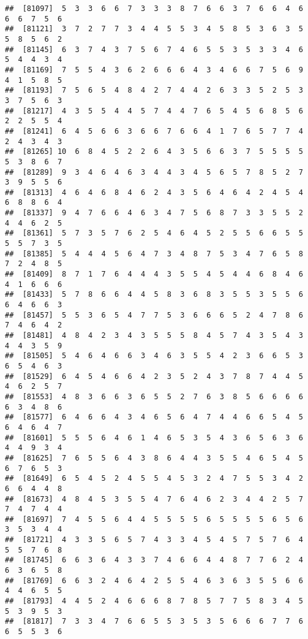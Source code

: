 \documentclass[
]{book}
\begin{document}
\begin{verbatim}
##  [81097]  5  3  3  6  6  7  3  3  3  8  7  6  6  3  7  6  6  4  6  6  6  7  5  6
##  [81121]  3  7  2  7  7  3  4  4  5  5  3  4  5  8  5  3  6  3  5  5  8  5  6  2
##  [81145]  6  3  7  4  3  7  5  6  7  4  6  5  5  3  5  3  3  4  6  5  4  4  3  4
##  [81169]  7  5  5  4  3  6  2  6  6  6  4  3  4  6  6  7  5  6  9  4  1  5  8  5
##  [81193]  7  5  6  5  4  8  4  2  7  4  4  2  6  3  3  5  2  5  3  3  7  5  6  3
##  [81217]  4  3  5  5  4  4  5  7  4  4  7  6  5  4  5  6  8  5  6  2  2  5  5  4
##  [81241]  6  4  5  6  6  3  6  6  7  6  6  4  1  7  6  5  7  7  4  2  4  3  4  3
##  [81265] 10  6  8  4  5  2  2  6  4  3  5  6  6  3  7  5  5  5  5  5  3  8  6  7
##  [81289]  9  3  4  6  4  6  3  4  4  3  4  5  6  5  7  8  5  2  7  3  9  5  5  6
##  [81313]  4  6  4  6  8  4  6  2  4  3  5  6  4  6  4  2  4  5  4  6  8  8  6  4
##  [81337]  9  4  7  6  6  4  6  3  4  7  5  6  8  7  3  3  5  5  2  4  4  6  2  5
##  [81361]  5  7  3  5  7  6  2  5  4  6  4  5  2  5  5  6  6  5  5  5  5  7  3  5
##  [81385]  5  4  4  4  5  6  4  7  3  4  8  7  5  3  4  7  6  5  8  7  2  4  8  5
##  [81409]  8  7  1  7  6  4  4  4  3  5  5  4  5  4  4  6  8  4  6  4  1  6  6  6
##  [81433]  5  7  8  6  6  4  4  5  8  3  6  8  3  5  5  3  5  5  6  6  4  6  6  3
##  [81457]  5  5  3  6  5  4  7  7  5  3  6  6  6  5  2  4  7  8  6  7  4  6  4  2
##  [81481]  4  8  4  2  3  4  3  5  5  5  8  4  5  7  4  3  5  4  3  4  4  3  5  9
##  [81505]  5  4  6  4  6  6  3  4  6  3  5  5  4  2  3  6  6  5  3  6  5  4  6  3
##  [81529]  6  4  5  4  6  6  4  2  3  5  2  4  3  7  8  7  4  4  5  4  6  2  5  7
##  [81553]  4  8  3  6  6  3  6  5  5  2  7  6  3  8  5  6  6  6  6  6  3  4  8  6
##  [81577]  6  4  6  6  4  3  4  6  5  6  4  7  4  4  6  6  5  4  5  6  4  6  4  7
##  [81601]  5  5  5  6  4  6  1  4  6  5  3  5  4  3  6  5  6  3  6  4  4  9  3  4
##  [81625]  7  6  5  5  6  4  3  8  6  4  4  3  5  5  4  6  5  4  5  6  7  6  5  3
##  [81649]  6  5  4  5  2  4  5  5  4  5  3  2  4  7  5  5  3  4  2  6  6  4  4  8
##  [81673]  4  8  4  5  3  5  5  4  7  6  4  6  2  3  4  4  2  5  7  7  4  7  4  4
##  [81697]  7  4  5  5  6  4  4  5  5  5  5  6  5  5  5  5  6  5  6  3  5  3  4  4
##  [81721]  4  3  3  5  6  5  7  4  3  3  4  5  4  5  7  5  7  6  4  5  5  7  6  8
##  [81745]  6  6  3  6  4  3  3  7  4  6  6  4  4  8  7  7  6  2  4  6  3  6  5  8
##  [81769]  6  6  3  2  4  6  4  2  5  5  4  6  3  6  3  5  5  6  6  4  4  6  5  5
##  [81793]  4  4  5  2  4  6  6  6  8  7  8  5  7  7  5  8  3  4  5  5  3  9  5  3
##  [81817]  7  3  3  4  7  6  6  5  5  3  5  3  5  6  6  6  7  7  6  6  5  5  3  6

\end{verbatim}
\end{document}
